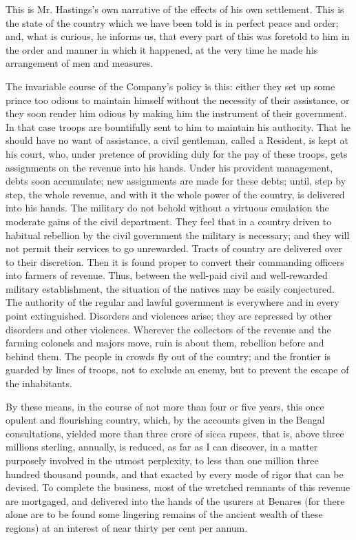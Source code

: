 This is Mr. Hastings's own narrative of the effects of his own settlement. This is the state of the country which we have been told is in perfect peace and order; and, what is curious, he informs us, that every part of this was foretold to him in the order and manner in which it happened, at the very time he made his arrangement of men and measures.

The invariable course of the Company's policy is this: either they set up some prince too odious to maintain himself without the necessity of their assistance, or they soon render him odious by making him the instrument of their government. In that case troops are bountifully sent to him to maintain his authority. That he should have no want of assistance, a civil gentleman, called a Resident, is kept at his court, who, under pretence of providing duly for the pay of these troops, gets assignments on the revenue into his hands. Under his provident management, debts soon accumulate; new assignments are made for these debts; until, step by step, the whole revenue, and with it the whole power of the country, is delivered into his hands. The military do not behold without a virtuous emulation the moderate gains of the civil department. They feel that in a country driven to habitual rebellion by the civil government the military is necessary; and they will not permit their services to go unrewarded. Tracts of country are delivered over to their discretion. Then it is found proper to convert their commanding officers into farmers of revenue. Thus, between the well-paid civil and well-rewarded military establishment, the situation of the natives may be easily conjectured. The authority of the regular and lawful government is everywhere and in every point extinguished. Disorders and violences arise; they are repressed by other disorders and other violences. Wherever the collectors of the revenue and the farming colonels and majors move, ruin is about them, rebellion before and behind them. The people in crowds fly out of the country; and the frontier is guarded by lines of troops, not to exclude an enemy, but to prevent the escape of the inhabitants.

By these means, in the course of not more than four or five years, this once opulent and flourishing country, which, by the accounts given in the Bengal consultations, yielded more than three crore of sicca rupees, that is, above three millions sterling, annually, is reduced, as far as I can discover, in a matter purposely involved in the utmost perplexity, to less than one million three hundred thousand pounds, and that exacted by every mode of rigor that can be devised. To complete the business, most of the wretched remnants of this revenue are mortgaged, and delivered into the hands of the usurers at Benares (for there alone are to be found some lingering remains of the ancient wealth of these regions) at an interest of near thirty per cent per annum.

